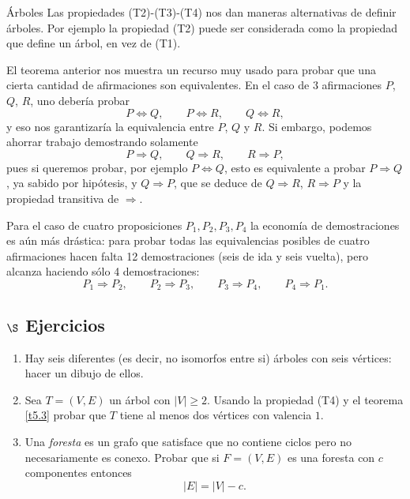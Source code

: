 \begin{section}{Árboles}
Las propiedades (T2)-(T3)-(T4) nos dan maneras alternativas de definir árboles. Por ejemplo la propiedad (T2) puede ser considerada como la propiedad que define un árbol, en vez de (T1). 

\begin{observacion*}
El teorema anterior nos muestra un recurso muy usado para probar que una cierta cantidad de afirmaciones son equivalentes. En el caso de $3$ afirmaciones $P$, $Q$, $R$, uno debería probar
$$
P \Leftrightarrow Q,\qquad P \Leftrightarrow R,\qquad Q \Leftrightarrow R,
$$
y eso nos garantizaría la equivalencia entre $P$, $Q$ y $R$. Si embargo, podemos ahorrar trabajo demostrando solamente
$$
P \Rightarrow Q,\qquad Q \Rightarrow R,\qquad R \Rightarrow P,
$$  
pues si queremos probar, por ejemplo $P \Leftrightarrow Q$, esto es equivalente a probar $P \Rightarrow Q$, ya sabido por hipótesis, y $Q \Rightarrow P$, que se deduce de $Q \Rightarrow R$, $R \Rightarrow P$ y la propiedad transitiva de $\Rightarrow$. 

Para el caso de cuatro proposiciones $P_1,P_2,P_3,P_4$ la economía de demostraciones es aún más drástica: para probar todas las equivalencias posibles de cuatro afirmaciones hacen falta 12 demostraciones (seis de ida y seis vuelta), pero alcanza haciendo sólo 4 demostraciones:
$$
P_1 \Rightarrow P_2,\qquad P_2 \Rightarrow P_3,\qquad P_3 \Rightarrow P_4,\qquad P_4 \Rightarrow P_1. 
$$ 
\end{observacion*}

\subsection*{$\S$ Ejercicios}\label{ejercicios5.5}
\begin{enumerate}
\item \label{ejercicio5.5.1} Hay seis diferentes (es decir, no isomorfos entre si) árboles con
seis vértices: hacer un dibujo de ellos.
\item Sea $T=(V,E)$ un árbol con $|V| \ge 2$. Usando la propiedad (T4) y el teorema
\ref{t5.3}
probar que $T$ tiene al menos dos vértices con valencia $1$.
\item Una \textit{foresta} es un grafo que satisface que no contiene ciclos pero no
necesariamente es conexo. Probar que si $F=(V,E)$ es una foresta con
$c$ componentes entonces
$$
|E|=|V|-c.
$$
\end{enumerate}

\end{section}


